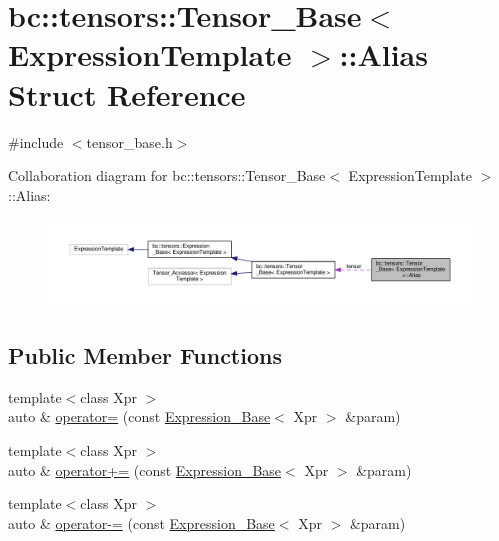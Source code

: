 \hypertarget{structbc_1_1tensors_1_1Tensor__Base_1_1Alias}{}\section{bc\+:\+:tensors\+:\+:Tensor\+\_\+\+Base$<$ Expression\+Template $>$\+:\+:Alias Struct Reference}
\label{structbc_1_1tensors_1_1Tensor__Base_1_1Alias}


{\ttfamily \#include $<$tensor\+\_\+base.\+h$>$}



Collaboration diagram for bc\+:\+:tensors\+:\+:Tensor\+\_\+\+Base$<$ Expression\+Template $>$\+:\+:Alias\+:\nopagebreak
\begin{figure}[H]
\begin{center}
\leavevmode
\includegraphics[width=350pt]{structbc_1_1tensors_1_1Tensor__Base_1_1Alias__coll__graph}
\end{center}
\end{figure}
\subsection*{Public Member Functions}
\begin{DoxyCompactItemize}
\item 
{\footnotesize template$<$class Xpr $>$ }\\auto \& \hyperlink{structbc_1_1tensors_1_1Tensor__Base_1_1Alias_aabbc3f738288104c07bfa77fe68de2fe}{operator=} (const \hyperlink{classbc_1_1tensors_1_1Expression__Base}{Expression\+\_\+\+Base}$<$ Xpr $>$ \&param)
\item 
{\footnotesize template$<$class Xpr $>$ }\\auto \& \hyperlink{structbc_1_1tensors_1_1Tensor__Base_1_1Alias_aca7a44a5cd4994ecdbc094b092a50879}{operator+=} (const \hyperlink{classbc_1_1tensors_1_1Expression__Base}{Expression\+\_\+\+Base}$<$ Xpr $>$ \&param)
\item 
{\footnotesize template$<$class Xpr $>$ }\\auto \& \hyperlink{structbc_1_1tensors_1_1Tensor__Base_1_1Alias_ab5c7e5fa42ac5d4dcb1b95325cef5541}{operator-\/=} (const \hyperlink{classbc_1_1tensors_1_1Expression__Base}{Expression\+\_\+\+Base}$<$ Xpr $>$ \&param)
\end{DoxyCompactItemize}
